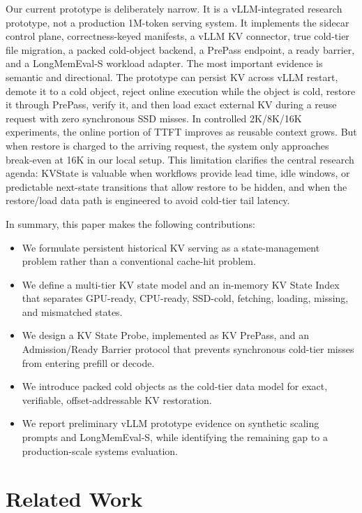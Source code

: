 \documentclass[sigconf,review,anonymous]{acmart}
\newcommand{\system}{KVState\xspace}
\begin{document}
Our current prototype is deliberately narrow. It is a vLLM-integrated research
prototype, not a production 1M-token serving system. It implements the sidecar
control plane, correctness-keyed manifests, a vLLM KV connector, true cold-tier
file migration, a packed cold-object backend, a PrePass endpoint, a ready
barrier, and a LongMemEval-S workload adapter. The most important evidence is
semantic and directional. The prototype can persist KV across vLLM restart,
demote it to a cold object, reject online execution while the object is cold,
restore it through PrePass, verify it, and then load exact external KV during a
reuse request with zero synchronous SSD misses. In controlled 2K/8K/16K
experiments, the online portion of TTFT improves as reusable context grows. But
when restore is charged to the arriving request, the system only approaches
break-even at 16K in our local setup. This limitation clarifies the central
research agenda: \system is valuable when workflows provide lead time, idle
windows, or predictable next-state transitions that allow restore to be hidden,
and when the restore/load data path is engineered to avoid cold-tier tail
latency.

In summary, this paper makes the following contributions:
\begin{itemize}[leftmargin=*]
  \item We formulate persistent historical KV serving as a state-management
  problem rather than a conventional cache-hit problem.
  \item We define a multi-tier KV state model and an in-memory KV State Index
  that separates GPU-ready, CPU-ready, SSD-cold, fetching, loading, missing,
  and mismatched states.
  \item We design a KV State Probe, implemented as KV PrePass, and an
  Admission/Ready Barrier protocol that prevents synchronous cold-tier misses
  from entering prefill or decode.
  \item We introduce packed cold objects as the cold-tier data model for exact,
  verifiable, offset-addressable KV restoration.
  \item We report preliminary vLLM prototype evidence on synthetic scaling
  prompts and LongMemEval-S, while identifying the remaining gap to a
  production-scale systems evaluation.
\end{itemize}

\section{Related Work}
\end{document}
